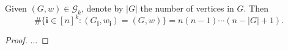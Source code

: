 
\begin{lemma}
  \label{lem:}
  \notready
  \uses{}
  Given $(G,w) \in \mathcal{G}_k$, denote by $|G|$ the number of vertices in $G$. Then
  $$\# \{ \mathbf{i} \in [n]^k : (G_\mathbf{i},w_\mathbf{i}) = (G,w) \} = n (n-1) \cdots (n - |G| + 1).$$ 
\end{lemma}

\begin{proof}
  \notready
  ...
\end{proof}























\fi
